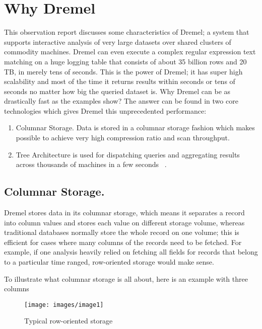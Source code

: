 \documentclass[9pt,twocolumn,twoside]{styles/osajnl}
\begin{document}
\section{Why Dremel}

This observation report discusses some characteristics of Dremel; a system that supports interactive analysis of very large datasets over shared clusters of commodity machines.  Dremel can even execute a complex regular expression text matching on a huge logging table that consists of about 35 billion rows and 20 TB, in merely tens of seconds. This is the power of Dremel; it has super high scalability and most of the time it returns results within seconds or tens of seconds no matter how big the queried dataset is.  Why Dremel can be as drastically fast as the examples show? The answer can be found in two core technologies which gives Dremel this unprecedented performance: 

\begin{enumerate}
  \item 	Columnar Storage. Data is stored in a columnar storage fashion which makes possible to achieve very high compression ratio and scan throughput.
  \item Tree Architecture is used for dispatching queries and aggregating results across thousands of machines in a few seconds ~\cite{paper-dremel}.
\end{enumerate}

\subsection{Columnar Storage.}
Dremel stores data in its columnar storage, which means it separates a record into column values and stores each value on different storage volume, whereas traditional databases normally store the whole record on one volume; this is efficient for cases where many columns of the records need to be fetched. For example, if one analysis heavily relied on fetching all fields for records that belong to a particular time ranged, row-oriented storage would make sense. 

To illustrate what columnar storage is all about, here is an example with three columns


\begin{figure}[H]
 \centering
\texttt{[image: images/image1]}
\caption{Typical row-oriented storage}
\end{figure}
\end{document}
